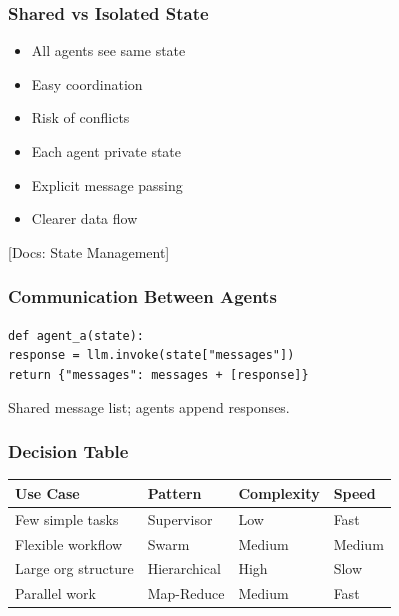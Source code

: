 \documentclass[aspectratio=169,11pt]{beamer}
\newcommand{\docref}[1]{{\scriptsize\color{docgray}[Docs: #1]}}
\begin{document}
\begin{frame}
\frametitle{Shared vs Isolated State}
\begin{warningbox}
\setlength{\itemsep}{1pt}
\begin{itemize}
\item All agents see same state
\item Easy coordination
\item Risk of conflicts
\end{itemize}
\end{warningbox}
\vspace{0.1cm}
\begin{tipbox}
\setlength{\itemsep}{1pt}
\begin{itemize}
\item Each agent private state
\item Explicit message passing
\item Clearer data flow
\end{itemize}
\end{tipbox}
\docref{State Management}
\end{frame}

\begin{frame}
\frametitle{Communication Between Agents}
\begin{tipbox}
\texttt{def agent\_a(state):}\\
\texttt{response = llm.invoke(state["messages"])}\\
\texttt{return \{"messages": messages + [response]\}}
\end{tipbox}
\vspace{0.1cm}
\begin{tipbox}[Pattern]
Shared message list; agents append responses.
\end{tipbox}
\end{frame}

\begin{frame}
\frametitle{Decision Table}
\begin{center}
\footnotesize
\begin{tabular}{llll}
\toprule
\textbf{Use Case} & \textbf{Pattern} & \textbf{Complexity} & \textbf{Speed} \\
\midrule
Few simple tasks & Supervisor & Low & Fast \\
Flexible workflow & Swarm & Medium & Medium \\
Large org structure & Hierarchical & High & Slow \\
Parallel work & Map-Reduce & Medium & Fast \\
\toprule
\end{tabular}
\end{center}
\end{frame}
\end{document}
